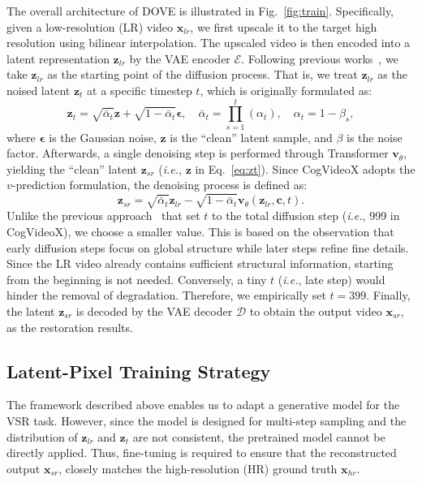\documentclass{article}
\newcommand\ie{\textit{i.e.}}
\begin{document}
The overall architecture of DOVE is illustrated in Fig.~\ref{fig:train}. Specifically, given a low-resolution (LR) video $\mathbf{x}_{lr}$, we first upscale it to the target high resolution using bilinear interpolation. The upscaled video is then encoded into a latent representation $\mathbf{z}_{lr}$ by the VAE encoder $\mathcal{E}$. Following previous works~\cite{wu2023seesr,wu2024one}, we take $\mathbf{z}_{lr}$ as the starting point of the diffusion process. That is,  we treat $\mathbf{z}_{lr}$ as the noised latent $\mathbf{z}_t$ at a specific timestep $t$, which is originally formulated as:
\begin{equation}
\mathbf{z}_t  = \sqrt{\bar{\alpha}_t} \mathbf{z} + \sqrt{1-\bar{\alpha}_t} \boldsymbol{\epsilon}, \quad \bar{\alpha}_t=\prod_{s=1}^t (\alpha_t), \quad \alpha_t = 1-\beta_s,
\label{eq:zt}
\end{equation}
where $\boldsymbol{\epsilon}$ is the Gaussian noise, $\mathbf{z}$ is the ``clean'' latent sample, and $\beta$ is the noise factor.
Afterwards, a single denoising step is performed through Transformer $\mathbf{v}_\theta$, yielding the ``clean'' latent $\mathbf{z}_{sr}$ (\ie, $\mathbf{z}$ in Eq.~\eqref{eq:zt}). Since CogVideoX adopts the $v$-prediction formulation, the denoising process is defined as:
\begin{equation}
\mathbf{z}_{sr} = \sqrt{\bar{\alpha}_t} \mathbf{z}_{lr} - \sqrt{1-\bar{\alpha}_t} \mathbf{v}_\theta\left(\mathbf{z}_{lr}, \mathbf{c}, t\right).
\label{eq:denoise}
\end{equation}
Unlike the previous approach~\cite{wu2024one} that set $t$ to the total diffusion step (\ie, 999 in CogVideoX), we choose a smaller value.
This is based on the observation that early diffusion steps focus on global structure while later steps refine fine details. Since the LR video already contains sufficient structural information, starting from the beginning is not needed. Conversely, a tiny $t$ (\ie, late step) would hinder the removal of degradation. Therefore, we empirically set $t$$=$$399$. Finally, the latent $\mathbf{z}_{sr}$ is decoded by the VAE decoder $\mathcal{D}$ to obtain the output video $\mathbf{x}_{sr}$, as the restoration results.

\vspace{-3.mm}
\subsection{Latent-Pixel Training Strategy}
\vspace{-2.mm}
The framework described above enables us to adapt a generative model for the VSR task. However, since the model is designed for multi-step sampling and the distribution of $\mathbf{z}_{lr}$ and $\mathbf{z}_{t}$ are not consistent, the pretrained model cannot be directly applied. Thus, fine-tuning is required to ensure that the reconstructed output $\mathbf{x}_{sr}$, closely matches the high-resolution (HR) ground truth $\mathbf{x}_{hr}$. 
\end{document}
